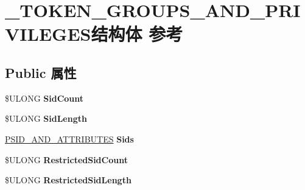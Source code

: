 \hypertarget{struct___t_o_k_e_n___g_r_o_u_p_s___a_n_d___p_r_i_v_i_l_e_g_e_s}{}\section{\+\_\+\+T\+O\+K\+E\+N\+\_\+\+G\+R\+O\+U\+P\+S\+\_\+\+A\+N\+D\+\_\+\+P\+R\+I\+V\+I\+L\+E\+G\+E\+S结构体 参考}
\label{struct___t_o_k_e_n___g_r_o_u_p_s___a_n_d___p_r_i_v_i_l_e_g_e_s}
\subsection*{Public 属性}
\begin{DoxyCompactItemize}
\item 
\mbox{\label{struct___t_o_k_e_n___g_r_o_u_p_s___a_n_d___p_r_i_v_i_l_e_g_e_s_ab8a71210b493e83485dc4a33952a0379}} 
\$U\+L\+O\+NG {\bfseries Sid\+Count}
\item 
\mbox{\label{struct___t_o_k_e_n___g_r_o_u_p_s___a_n_d___p_r_i_v_i_l_e_g_e_s_ae259b4aec1647eda6dd422338fa0ac8e}} 
\$U\+L\+O\+NG {\bfseries Sid\+Length}
\item 
\mbox{\label{struct___t_o_k_e_n___g_r_o_u_p_s___a_n_d___p_r_i_v_i_l_e_g_e_s_a35e6ff62ad2bfc098f44cd6f0ea9bc67}} 
\hyperlink{struct___s_i_d___a_n_d___a_t_t_r_i_b_u_t_e_s}{P\+S\+I\+D\+\_\+\+A\+N\+D\+\_\+\+A\+T\+T\+R\+I\+B\+U\+T\+ES} {\bfseries Sids}
\item 
\mbox{\label{struct___t_o_k_e_n___g_r_o_u_p_s___a_n_d___p_r_i_v_i_l_e_g_e_s_a94f76c3455a0f7467b5104bdf73762f9}} 
\$U\+L\+O\+NG {\bfseries Restricted\+Sid\+Count}
\item 
\mbox{\label{struct___t_o_k_e_n___g_r_o_u_p_s___a_n_d___p_r_i_v_i_l_e_g_e_s_a2a7c7d326e7298bfc95e5323d22e88e5}} 
\$U\+L\+O\+NG {\bfseries Restricted\+Sid\+Length}
\item 
\mbox{\label{struct___t_o_k_e_n___g_r_o_u_p_s___a_n_d___p_r_i_v_i_l_e_g_e_s_a70a08e9282be64d89d40053efc9dd5d4}} 

\end{DoxyCompactItemize}
